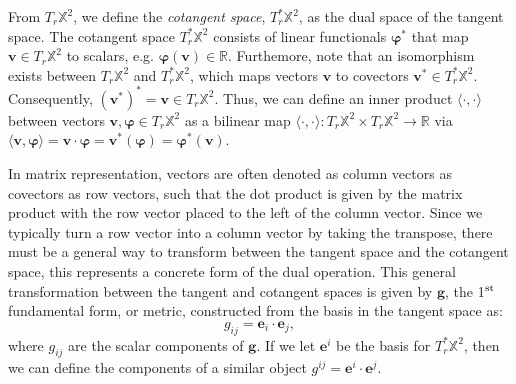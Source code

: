 \begin{appendices}
From $T_r\mathbb{X}^2$, we define the \emph{cotangent space}, $T^*_r\mathbb{X}^2$, as the dual space of the tangent space.
The cotangent space $T^*_r\mathbb{X}^2$ consists of linear functionals $\bm{\varphi}^*$ that map $\mathbf{v} \in T_r\mathbb{X}^2$ to scalars, e.g. $\bm{\varphi}(\mathbf{v}) \in \mathbb{R}$.
Furthemore, note that an isomorphism exists between $T_r\mathbb{X}^2$ and $T^*_r\mathbb{X}^2$, which maps vectors $\mathbf{v}$ to covectors $\mathbf{v}^* \in T^*_r\mathbb{X}^2$.
Consequently, $(\mathbf{v}^*)^* = \mathbf{v} \in T_r\mathbb{X}^2$.
Thus, we can define an inner product $\langle \cdot, \cdot \rangle$ between vectors $\mathbf{v},\bm{\varphi} \in T_r\mathbb{X}^2$ as a bilinear map
 $\langle \cdot, \cdot \rangle : T_r\mathbb{X}^2 \times T_r\mathbb{X}^2 \rightarrow \mathbb{R}$
 via $\langle \mathbf{v}, \bm{\varphi} \rangle = \mathbf{v} \cdot \bm{\varphi} = \mathbf{v}^*(\bm{\varphi}) = \bm{\varphi}^*(\mathbf{v}) $.

In matrix representation, vectors are often denoted as column vectors as covectors as row vectors, such that the dot product is given by the matrix product with the row vector placed to the left of the column vector.
Since we typically turn a row vector into a column vector by taking the transpose, there must be a general way to transform between the tangent space and the cotangent space, this represents a concrete form of the dual operation.
This general transformation between the tangent and cotangent spaces is given by $\mathbf{g}$, the 1$^{\rm st}$ fundamental form, or metric, constructed from the basis in the tangent space as:
\begin{equation}
  g_{ij} = \mathbf{e}_i \cdot \mathbf{e}_j,\label{e:A-metric}
\end{equation}
where $g_{ij}$ are the scalar components of $\mathbf{g}$.
If we let $\mathbf{e}^i$ be the basis for $T^*_r\mathbb{X}^{2}$, then we can define the components of a similar object $g^{ij} = \mathbf{e}^i \cdot \mathbf{e}^j$. \\


\end{appendices}
